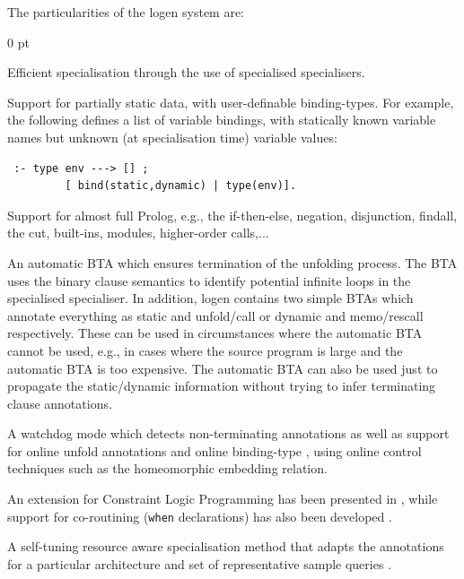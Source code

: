 \documentclass{sig-alternate}
\newenvironment{zitemize}%
   {\begin{list}{--}{
   \setlength{\itemsep}{0 pt}
   \setlength{\parsep}{0 pt}
   \setlength{\topsep} {0 pt} }}%
   {\end{list}}
\begin{document}
The particularities of the {\sc logen} system are:
 \begin{zitemize}
 \item Efficient specialisation through the use of specialised specialisers.
\item Support for partially static data, with user-definable binding-types. For example,
 the following defines  a list of variable bindings, with statically 
 known variable names but unknown (at specialisation time) variable values:
 
 \begin{footnotesize}
\begin{verbatim}
 :- type env ---> [] ;
         [ bind(static,dynamic) | type(env)].
\end{verbatim}
  \end{footnotesize}
  
\item Support for almost full Prolog, e.g., the if-then-else, negation,
  disjunction, findall, the cut, built-ins, modules, 
   higher-order calls,...
  
\item An automatic BTA   \cite{BTA:Lopstr04} which ensures termination of the unfolding process.
 The BTA uses the binary clause semantics to identify potential infinite loops in the
  specialised specialiser.
  In addition,  {\sc logen} contains two simple BTAs which annotate
 everything as static and unfold/call or dynamic and memo/rescall respectively.
These can be used in circumstances where the automatic BTA cannot be
 used, e.g., in cases where the source program is large and the automatic BTA
 is too expensive.
The automatic BTA can also be used just to propagate the static/dynamic information
 without trying to infer terminating clause annotations. 
  
\item A watchdog mode which detects non-terminating annotations 
 as well as support for online unfold annotations and online binding-type 
\cite{LeuschelCraig:SemiWatch}, using online control techniques
 such as the homeomorphic embedding relation.

\item An extension for Constraint Logic Programming  has been
 presented in \cite{CraigLeuschel:PSI03}, while support for co-routining
  ({\tt when} declarations)  has
  also been developed \cite{Craig:Phd}.
\item A self-tuning resource aware specialisation method
  that adapts the annotations for a particular architecture and
 set of representative sample queries \cite{CraigLeuschel:PPDP05}.
 \end{zitemize}
\end{document}
